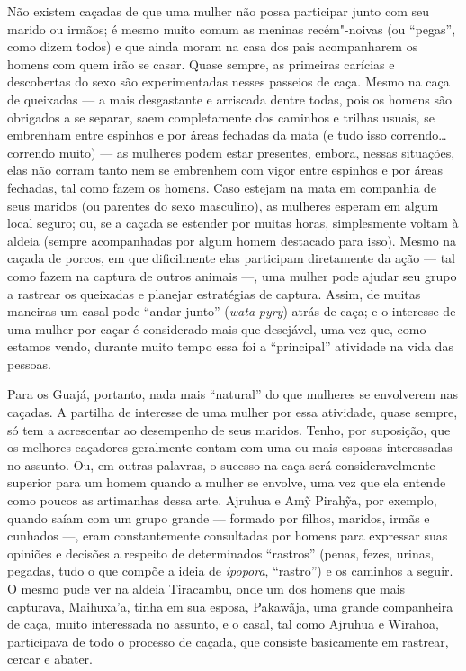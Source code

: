 Não existem caçadas de que uma mulher não possa participar junto com seu
marido ou irmãos; é mesmo muito comum as meninas recém"-noivas (ou
``pegas'', como dizem todos) e que ainda moram na casa dos pais
acompanharem os homens com quem irão se casar. Quase sempre, as
primeiras carícias e descobertas do sexo são experimentadas nesses
passeios de caça. Mesmo na caça de queixadas --- a mais desgastante e
arriscada dentre todas, pois os homens são obrigados a se separar, saem
completamente dos caminhos e trilhas usuais, se embrenham entre espinhos
e por áreas fechadas da mata (e tudo isso correndo\ldots{} correndo muito) ---
as mulheres podem estar presentes, embora, nessas situações, elas não
corram tanto nem se embrenhem com vigor entre espinhos e por áreas
fechadas, tal como fazem os homens. Caso estejam na mata em companhia de
seus maridos (ou parentes do sexo masculino), as mulheres esperam em
algum local seguro; ou, se a caçada se estender por muitas horas,
simplesmente voltam à aldeia (sempre acompanhadas por algum homem
destacado para isso). Mesmo na caçada de porcos, em que dificilmente
elas participam diretamente da ação --- tal como fazem na captura de
outros animais ---, uma mulher pode ajudar seu grupo a rastrear os
queixadas e planejar estratégias de captura. Assim, de muitas maneiras
um casal pode ``andar junto'' (\emph{wata} \emph{pyry}) atrás de caça; e o
interesse de uma mulher por caçar é considerado mais que desejável, uma
vez que, como estamos vendo, durante muito tempo essa foi a ``principal''
atividade na vida das pessoas.

Para os Guajá, portanto, nada mais ``natural'' do que mulheres se
envolverem nas caçadas. A partilha de interesse de uma mulher por essa
atividade, quase sempre, só tem a acrescentar ao desempenho de seus
maridos. Tenho, por suposição, que os melhores caçadores geralmente
contam com uma ou mais esposas interessadas no assunto. Ou, em outras
palavras, o sucesso na caça será consideravelmente superior para um
homem quando a mulher se envolve, uma vez que ela entende como poucos as
artimanhas dessa arte. Ajruhua e Amỹ Pirahỹa, por exemplo, quando saíam
com um grupo grande --- formado por filhos, maridos, irmãs e cunhados ---,
eram constantemente consultadas por homens para expressar suas opiniões
e decisões a respeito de determinados ``rastros'' (penas, fezes, urinas,
pegadas, tudo o que compõe a ideia de \emph{ipopora}, ``rastro'') e os
caminhos a seguir. O mesmo pude ver na aldeia Tiracambu, onde um dos
homens que mais capturava, Maihuxa'a, tinha em sua esposa, Pakawãja, uma
grande companheira de caça, muito interessada no assunto, e o casal, tal
como Ajruhua e Wirahoa, participava de todo o processo de caçada, que
consiste basicamente em rastrear, cercar e abater.

